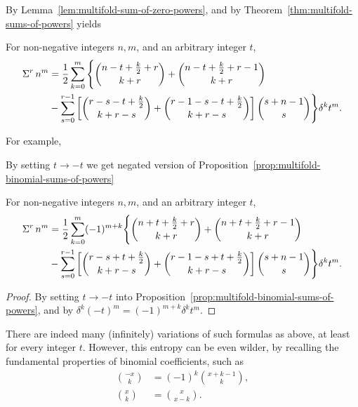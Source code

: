 By Lemma~\eqref{lem:multifold-sum-of-zero-powers}, and
by Theorem~\eqref{thm:multifold-sums-of-powers} yields
\begin{proposition}
  \label{prop:multifold-binomial-sums-of-powers}
  For non-negative integers $n,m$, and an arbitrary integer $t$,
  \begin{align*}
    \Sigma^{r}\,{n}^{m}
    &= \frac{1}{2} \sum_{k=0}^{m}
    \Bigg \{
      \binom{n-t+\frac{k}{2}+r}{k+r} + \binom{n-t+\frac{k}{2}+r-1}{k+r} \\
      &-
      \sum_{s=0}^{r-1}
      \left[
        \binom{r-s-t+\frac{k}{2}}{k+r-s} + \binom{r-1-s-t+\frac{k}{2}}{k+r-s}
      \right] \binom{s+n-1}{s}
    \Bigg \} \delta^{k} t^m.
  \end{align*}
\end{proposition}
For example,

By setting $t \rightarrow -t$ we get negated version
of Proposition~\eqref{prop:multifold-binomial-sums-of-powers}
\begin{proposition}
  \label{prop:multifold-binomial-sums-of-powers-negated}
  For non-negative integers $n,m$, and an arbitrary integer $t$,
  \begin{align*}
    \Sigma^{r}\,{n}^{m}
    &= \frac{1}{2} \sum_{k=0}^{m} (-1)^{m+k}
    \Bigg \{
      \binom{n+t+\frac{k}{2}+r}{k+r} + \binom{n+t+\frac{k}{2}+r-1}{k+r} \\
      &-
      \sum_{s=0}^{r-1}
      \left[
        \binom{r-s+t+\frac{k}{2}}{k+r-s} + \binom{r-1-s+t+\frac{k}{2}}{k+r-s}
      \right] \binom{s+n-1}{s}
    \Bigg \} \delta^{k} t^m.
  \end{align*}
  \begin{proof}
    By setting $t \rightarrow -t$ into
    Proposition~\eqref{prop:multifold-binomial-sums-of-powers}, and by
    $\delta^k (-t)^m = (-1)^{m+k} \delta^{k} t^{m}$.
  \end{proof}
\end{proposition}
There are indeed many (infinitely) variations of such formulas as above,
at least for every integer $t$.
However, this entropy can be even wilder, by recalling the fundamental properties
of binomial coefficients, such as
\begin{align*}
  \binom{-x}{k} &= (-1)^{k} \binom{x+k-1}{k}, \\
  \binom{x}{k}  &= \binom{x}{x-k}.
\end{align*}
